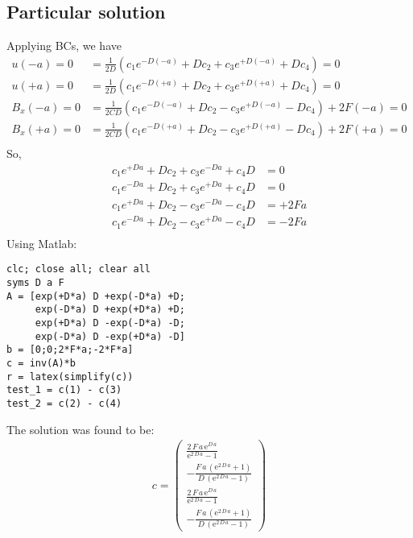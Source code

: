 \documentclass[11pt]{article}
\begin{document}
\subsection{Particular solution}

Applying BCs, we have
\begin{equation}\begin{aligned}
u(-a)   = 0 & = \frac{1}{2D} ( c_1 e^{-D (-a)} + D c_2 + c_3 e^{+D (-a)} + D c_4) = 0 \\
u(+a)   = 0 & = \frac{1}{2D} ( c_1 e^{-D (+a)} + D c_2 + c_3 e^{+D (+a)} + D c_4) = 0 \\
B_x(-a) = 0 & = \frac{1}{2CD} (c_1 e^{-D (-a)} + D c_2 - c_3 e^{+D (-a)} - D c_4) + 2 F (-a)= 0 \\
B_x(+a) = 0 & = \frac{1}{2CD} (c_1 e^{-D (+a)} + D c_2 - c_3 e^{+D (+a)} - D c_4) + 2 F (+a)= 0 \\
\end{aligned} \end{equation}
So,
\begin{equation}\begin{aligned}
c_1 e^{+D a} + D c_2 + c_3 e^{-D a} + c_4 D & = 0 \\
c_1 e^{-D a} + D c_2 + c_3 e^{+D a} + c_4 D & = 0 \\
c_1 e^{+D a} + D c_2 - c_3 e^{-D a} - c_4 D & = +2 F a \\
c_1 e^{-D a} + D c_2 - c_3 e^{+D a} - c_4 D & = -2 F a \\
\end{aligned} \end{equation}
Using Matlab:
\begin{verbatim}
clc; close all; clear all
syms D a F
A = [exp(+D*a) D +exp(-D*a) +D;
     exp(-D*a) D +exp(+D*a) +D;
     exp(+D*a) D -exp(-D*a) -D;
     exp(-D*a) D -exp(+D*a) -D]
b = [0;0;2*F*a;-2*F*a]
c = inv(A)*b
r = latex(simplify(c))
test_1 = c(1) - c(3)
test_2 = c(2) - c(4)
\end{verbatim}
The solution was found to be:
\begin{equation}\begin{aligned}
c = \left(\begin{array}{c} \frac{2\, F\, a\, \mathrm{e}^{D\, a}}{\mathrm{e}^{2\, D\, a} - 1}\\ -\frac{F\, a\, \left(\mathrm{e}^{2\, D\, a} + 1\right)}{D\, \left(\mathrm{e}^{2\, D\, a} - 1\right)}\\ \frac{2\, F\, a\, \mathrm{e}^{D\, a}}{\mathrm{e}^{2\, D\, a} - 1}\\ -\frac{F\, a\, \left(\mathrm{e}^{2\, D\, a} + 1\right)}{D\, \left(\mathrm{e}^{2\, D\, a} - 1\right)} \end{array}\right) \\
\end{aligned} \end{equation}
\end{document}
